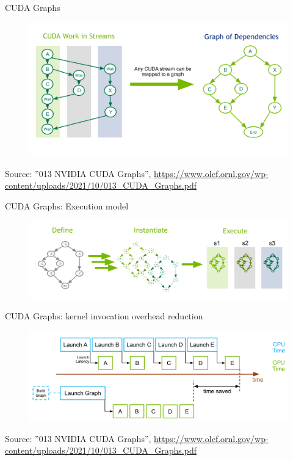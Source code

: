 \documentclass[xcolor=table]{beamer}
\begin{document}
\begin{frame}{CUDA Graphs}
  \begin{figure}
    \includegraphics[scale=0.2]{imgs/cuda_graphs_streams_and_graphs.png}
  \end{figure}
  \footnotesize Source: ''013 NVIDIA CUDA Graphs'', \url{https://www.olcf.ornl.gov/wp-content/uploads/2021/10/013_CUDA_Graphs.pdf}
\end{frame}

\begin{frame}{CUDA Graphs: Execution model}
  \begin{figure}
    \includegraphics[scale=0.2]{imgs/cuda_graphs_execution_model.png}
  \end{figure}
\end{frame}

\begin{frame}{CUDA Graphs: kernel invocation overhead reduction}
  \begin{figure}
    \includegraphics[scale=0.2]{imgs/cuda_graphs_kernel_invocation_overhead_reduction.png}
  \end{figure}
  \footnotesize Source: ''013 NVIDIA CUDA Graphs'', \url{https://www.olcf.ornl.gov/wp-content/uploads/2021/10/013_CUDA_Graphs.pdf}
\end{frame}
\end{document}
